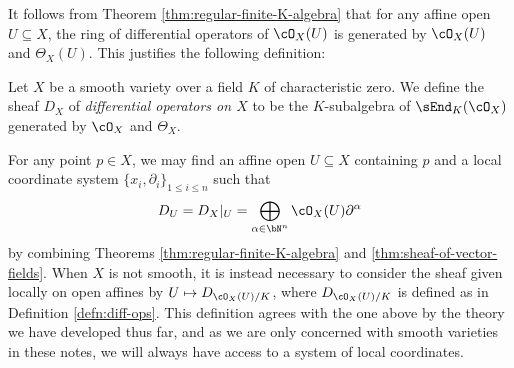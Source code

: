 It follows from Theorem \ref{thm:regular-finite-K-algebra} that for any affine open $U \subseteq X$, the ring of differential operators of $\cO_X(U)$ is generated by $\cO_X(U)$ and $\Theta_X(U)$. This justifies the following definition:
\begin{defn}\label{defn:sheaf-of-differential-operators}
	Let $X$ be a smooth variety over a field $K$ of characteristic zero. We define the sheaf $D_X$ of \emph{differential operators on $X$} to be the $K$-subalgebra of $\sEnd_{K}(\cO_X)$ generated by $\cO_X$ and $\Theta_X$. 
\end{defn}
For any point $p \in X$, we may find an affine open $U \subseteq X$ containing $p$ and a local coordinate system $\{x_i,\partial_i\}_{1\leq i\leq n}$ such that
\begin{align*}
	D_U = D_X|_U = \bigoplus_{\alpha \in \bN^n}\cO_X(U) \partial^{\alpha}
\end{align*}
by combining Theorems \ref{thm:regular-finite-K-algebra} and \ref{thm:sheaf-of-vector-fields}. When $X$ is not smooth, it is instead necessary to consider the sheaf given locally on open affines by $U \mapsto D_{\cO_X(U)/K}$, where $D_{\cO_X(U)/K}$ is defined as in Definition \ref{defn:diff-ops}. This definition agrees with the one above by the theory we have developed thus far, and as we are only concerned with smooth varieties in these notes, we will always have access to a system of local coordinates.

